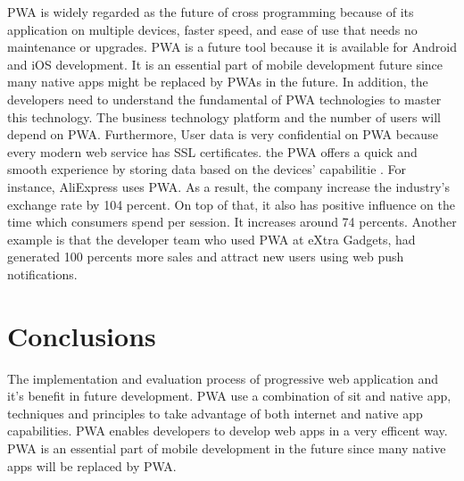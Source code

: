 \documentclass{article}
\begin{document}
PWA is widely regarded as the future of cross programming because of its application on multiple devices, faster speed, and ease of use that needs no maintenance or upgrades. PWA is a future tool because it is available for Android and iOS development. It is an essential part of mobile development future since many native apps might be replaced by PWAs in the future. In addition, the developers need to understand the fundamental of PWA technologies to master this technology. The business technology platform and the number of users will depend on PWA. Furthermore, User data is very confidential on PWA because every modern web service has SSL certificates. the PWA offers a quick and smooth experience by storing data based on the devices' capabilitie \cite{deveArticle}. For instance, AliExpress uses PWA. As a result, the company increase the industry's exchange rate by 104 percent. On top of that, it also has positive influence on the time which consumers spend per session. It increases around 74 percents. Another example is that the developer team who used PWA  at eXtra Gadgets, had generated 100 percents more sales and attract new users using web push notifications.


\section*{Conclusions}
The implementation and evaluation process of progressive web application and it's benefit in future development. PWA use a combination of sit and native app, techniques and principles to take advantage of both internet and native app capabilities. PWA enables developers to develop web apps in a very efficent way. PWA is an essential part of mobile development in the future since many native apps will be replaced by PWA. 




\medskip

\printbibliography
\end{document}
